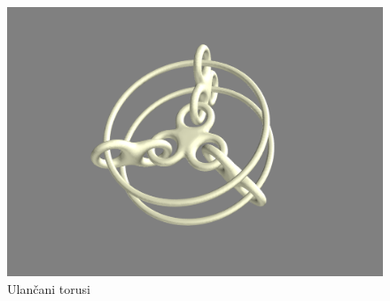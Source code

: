 \documentclass[a4paper,12pt]{article}
\theoremstyle{zad}
\begin{document}
\begin{figure}
\centering
\includegraphics[scale=0.12]{torusi2.png}
\caption{Ulančani torusi}\label{model}
\end{figure}
\end{document}
